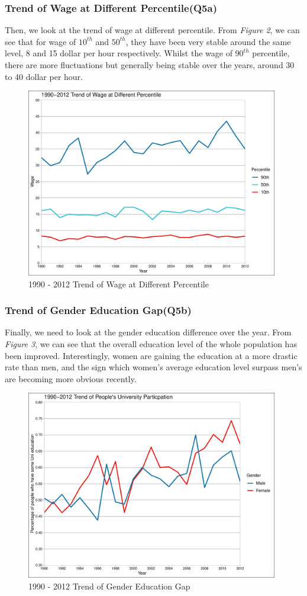\documentclass{article}
\begin{document}
\subsubsection{Trend of Wage at Different Percentile(Q5a) }
Then, we look at the trend of wage at different percentile. From \textit{Figure 2}, we can see that for wage of $10^{th}$ and $50^{th}$, they have been very stable around the same level, 8 and 15 dollar per hour respectively. Whilst the wage of $90^{th}$ percentile, there are more fluctuations but generally being stable over the years, around 30 to 40 dollar per hour.
\begin{figure}[H]
    \centering
    \includegraphics[width=110mm,scale=0.9]{q5p1.pdf}
    \caption{1990 - 2012 Trend of Wage at Different Percentile}
    \label{fig:my_label}
\end{figure}
\subsubsection{Trend of Gender Education Gap(Q5b) }
Finally, we need to look at the gender education difference over the year. From \textit{Figure 3}, we can see that the overall education level of the whole population has been improved. Interestingly, women are gaining the education at a more drastic rate than men, and the sign which women's average education level surpass men's are becoming more obvious recently.\\
\begin{figure}[H]
    \centering
    \includegraphics[width=110mm,scale=0.9]{q5p2.pdf}
    \caption{1990 - 2012 Trend of Gender Education Gap}
    \label{fig:my_label}
\end{figure}
\end{document}
